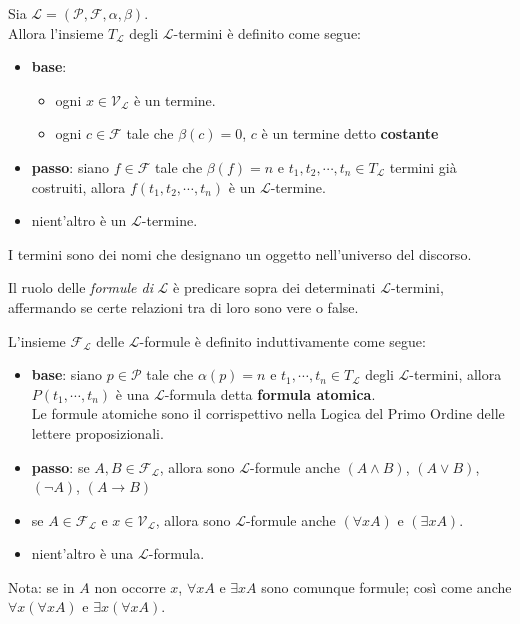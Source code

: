 \begin{defi}
  Sia $\mathscr{L} = (\mathscr{P}, \mathscr{F}, \alpha, \beta)$. \\
  Allora l'insieme $T_\mathscr{L}$ degli $\mathscr{L}$-termini è definito come segue:
  \begin{itemize}
    \item \textbf{base}:
      \begin{itemize}
        \item ogni $x \in \mathscr{V}_\mathscr{L}$ è un termine. 
        \item ogni $c \in \mathscr{F}$ tale che $\beta(c) = 0$, $c$ è un termine detto \textbf{costante}
      \end{itemize}
    \item \textbf{passo}: siano $f \in \mathscr{F}$ tale che $\beta(f) = n$ e $t_1, t_2, \cdots, t_n \in T_\mathscr{L}$ termini già costruiti, allora $f(t_1, t_2, \cdots, t_n)$ è un $\mathscr{L}$-termine. 
    \item nient'altro è un $\mathscr{L}$-termine.
  \end{itemize}
  I termini sono dei nomi che designano un oggetto nell'universo del discorso.
\end{defi}

\begin{defi}[Formule]
Il ruolo delle \textit{formule di} $\mathscr{L}$ è predicare sopra dei determinati $\mathscr{L}$-termini, affermando se certe relazioni tra di loro sono vere o false.

L'insieme $\mathscr{F}_\mathscr{L}$ delle $\mathscr{L}$-formule è definito induttivamente come segue:
\begin{itemize}
  \item \textbf{base}: siano $p \in \mathscr{P}$ tale che $\alpha(p)=n$ e $t_1, \cdots, t_n \in T_\mathscr{L}$ degli $\mathscr{L}$-termini, allora $P(t_1, \cdots, t_n)$ è una $\mathscr{L}$-formula detta \textbf{formula atomica}. \\
  Le formule atomiche sono il corrispettivo nella Logica del Primo Ordine delle lettere proposizionali.
  \item \textbf{passo}: se $A,B \in \mathscr{F}_\mathscr{L}$, allora sono $\mathscr{L}$-formule anche $(A \land B)$, $(A \lor B)$, $(\neg A)$, $(A\rightarrow B)$
  \item se $A \in \mathscr{F}_\mathscr{L}$ e $x \in \mathscr{V}_\mathscr{L}$, allora sono $\mathscr{L}$-formule anche $(\forall x A)$ e $(\exists x A)$.
  \item nient'altro è una $\mathscr{L}$-formula.
\end{itemize}
\end{defi}
Nota: se in $A$ non occorre $x$, $\forall x A$ e $\exists x A$ sono comunque formule; così come anche $\forall x (\forall x A)$ e $\exists x (\forall x A)$. 

